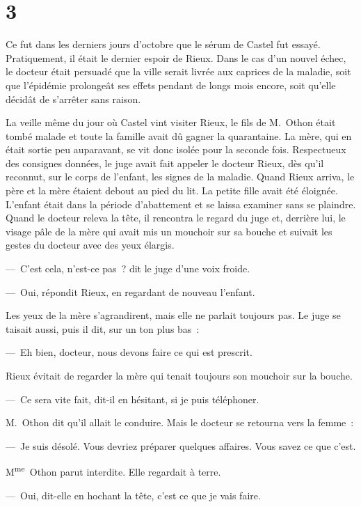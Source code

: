 \documentclass[french,twoside]{book} %
\begin{document}
\section[{3}]{3}
\noindent Ce fut dans les derniers jours d’octobre que le sérum de Castel fut essayé. Pratiquement, il était le dernier espoir de Rieux. Dans le cas d’un nouvel échec, le docteur était persuadé que la ville serait livrée aux caprices de la maladie, soit que l’épidémie prolongeât ses effets pendant de longs mois encore, soit qu’elle décidât de s’arrêter sans raison.\par
La veille même du jour où Castel vint visiter Rieux, le fils de M. Othon était tombé malade et toute la famille avait dû gagner la quarantaine. La mère, qui en était sortie peu auparavant, se vit donc isolée pour la seconde fois. Respectueux des consignes données, le juge avait fait appeler le docteur Rieux, dès qu’il reconnut, sur le corps de l’enfant, les signes de la maladie. Quand Rieux arriva, le père et la mère étaient debout au pied du lit. La petite fille avait été éloignée. L’enfant était dans la période d’abattement et se laissa examiner sans se plaindre. Quand le docteur releva la tête, il rencontra le regard du juge et, derrière lui, le visage pâle de la mère qui avait mis un mouchoir sur sa bouche et suivait les gestes du docteur avec des yeux élargis.\par
— C’est cela, n’est-ce pas ? dit le juge d’une voix froide.\par
— Oui, répondit Rieux, en regardant de nouveau l’enfant.\par
Les yeux de la mère s’agrandirent, mais elle ne parlait toujours pas. Le juge se taisait aussi, puis il dit, sur un ton plus bas :\par
— Eh bien, docteur, nous devons faire ce qui est prescrit.\par
Rieux évitait de regarder la mère qui tenait toujours son mouchoir sur la bouche.\par
— Ce sera vite fait, dit-il en hésitant, si je puis téléphoner.\par
M. Othon dit qu’il allait le conduire. Mais le docteur se retourna vers la femme :\par
— Je suis désolé. Vous devriez préparer quelques affaires. Vous savez ce que c’est.\par
M\textsuperscript{me} Othon parut interdite. Elle regardait à terre.\par
— Oui, dit-elle en hochant la tête, c’est ce que je vais faire.\par
\end{document}
